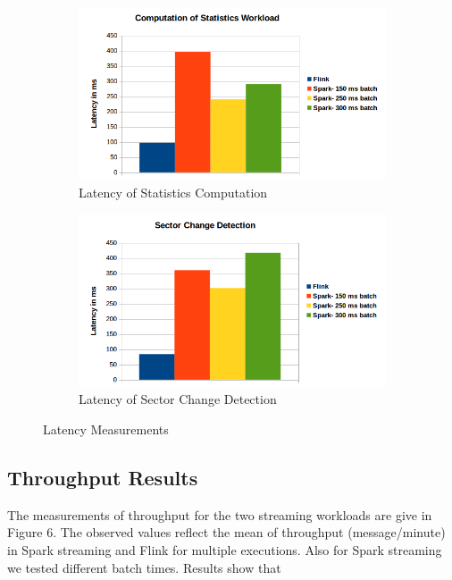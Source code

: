 \documentclass[]{article}
\begin{document}
\begin{figure}[h]
\begin{subfigure}{.5\textwidth}
  \centering
  \includegraphics[width=\linewidth]{latency1.png}
  \caption{Latency of Statistics Computation}

\end{subfigure}%
\begin{subfigure}{.5\textwidth}
  \centering
  \includegraphics[width=\linewidth]{latency2.png}
\caption{Latency of Sector Change Detection }

\end{subfigure}
\caption{Latency Measurements}
\label{fig:fig}
\end{figure}
\subsection{Throughput Results}

The  measurements of throughput for the two streaming workloads are give in Figure 6. The observed values reflect the mean of throughput (message/minute) 
 in Spark streaming and Flink for multiple executions. Also for Spark streaming we tested different 
 batch times. Results show that 
\end{document}
